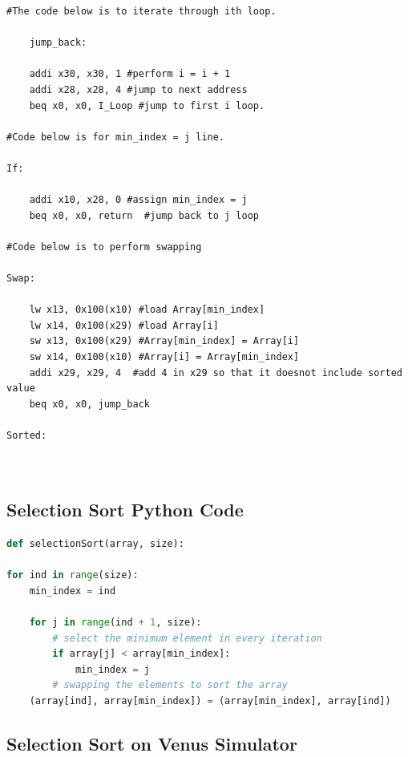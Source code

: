 \documentclass{article}
\begin{document}
\begin{lstlisting}[caption={Selection Sort Assembly code}, captionpos=b, language=RISC-V]
    #The code below is to iterate through ith loop.
    
    jump_back:
    
    addi x30, x30, 1 #perform i = i + 1
    addi x28, x28, 4 #jump to next address
    beq x0, x0, I_Loop #jump to first i loop.
    
#Code below is for min_index = j line.

If:

    addi x10, x28, 0 #assign min_index = j
    beq x0, x0, return  #jump back to j loop

#Code below is to perform swapping

Swap:

    lw x13, 0x100(x10) #load Array[min_index]
    lw x14, 0x100(x29) #load Array[i] 
    sw x13, 0x100(x29) #Array[min_index] = Array[i]
    sw x14, 0x100(x10) #Array[i] = Array[min_index]
    addi x29, x29, 4  #add 4 in x29 so that it doesnot include sorted value
    beq x0, x0, jump_back

Sorted:
    
    
\end{lstlisting}

\subsection{Selection Sort Python Code}

\begin{lstlisting}[caption={Selection Sort Python Code (Taken from GeeksforGeeks)}, captionpos=b, language=Python]
def selectionSort(array, size):

for ind in range(size):
    min_index = ind

    for j in range(ind + 1, size):
        # select the minimum element in every iteration
        if array[j] < array[min_index]:
            min_index = j
        # swapping the elements to sort the array
    (array[ind], array[min_index]) = (array[min_index], array[ind])    
\end{lstlisting}

\subsection{Selection Sort on Venus Simulator}
\end{document}
